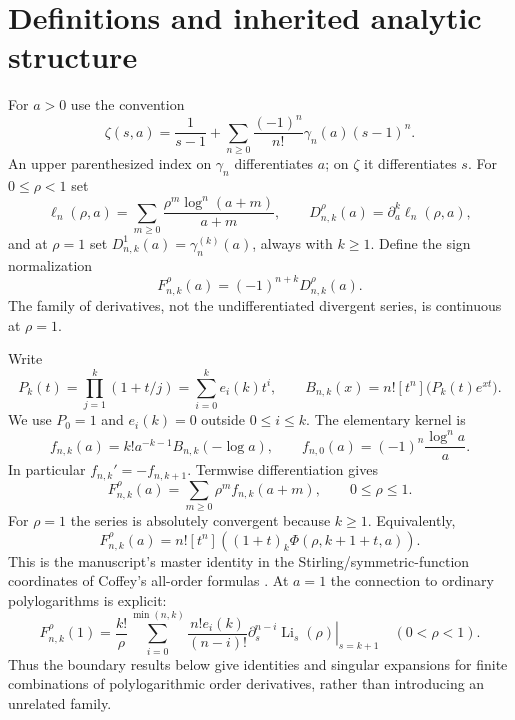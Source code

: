 \documentclass[11pt,letterpaper]{article}
\numberwithin{equation}{section}
\theoremstyle{definition}\newtheorem{definition}[theorem]{Definition}
\theoremstyle{remark}\newtheorem{remark}[theorem]{Remark}
\DeclareMathOperator{\Li}{Li}
\newcommand{\F}[3]{F_{#1,#2}^{#3}}
\newcommand{\coef}[2]{[#1^{#2}]}
\begin{document}
\section{Definitions and inherited analytic structure}\label{sec:structure}
For $a>0$ use the convention
\begin{equation}\label{eq:laurent}
 \zeta(s,a)=\frac1{s-1}+\sum_{n\ge0}\frac{(-1)^n}{n!}\gamma_n(a)(s-1)^n.
\end{equation}
An upper parenthesized index on $\gamma_n$ differentiates $a$; on $\zeta$ it differentiates $s$. For $0\le\rho<1$ set
\[
 \ell_n(\rho,a)=\sum_{m\ge0}\frac{\rho^m\log^n(a+m)}{a+m},
 \qquad
 D_{n,k}^{\rho}(a)=\partial_a^k\ell_n(\rho,a),
\]
and at $\rho=1$ set $D_{n,k}^{1}(a)=\gamma_n^{(k)}(a)$, always with $k\ge1$. Define the sign normalization
\begin{equation}\label{eq:F}
 \F nk\rho(a)=(-1)^{n+k}D_{n,k}^{\rho}(a).
\end{equation}
The family of derivatives, not the undifferentiated divergent series, is continuous at $\rho=1$.

Write
\begin{equation}\label{eq:Pk}
 P_k(t)=\prod_{j=1}^k(1+t/j)=\sum_{i=0}^k e_i(k)t^i,
 \qquad
 B_{n,k}(x)=n!\coef tn\bigl(P_k(t)e^{xt}\bigr).
\end{equation}
We use $P_0=1$ and $e_i(k)=0$ outside $0\le i\le k$. The elementary kernel is
\begin{equation}\label{eq:f}
 f_{n,k}(a)=k!a^{-k-1}B_{n,k}(-\log a),
 \qquad
 f_{n,0}(a)=(-1)^n\frac{\log^n a}{a}.
\end{equation}
In particular $f_{n,k}'=-f_{n,k+1}$. Termwise differentiation gives
\begin{equation}\label{eq:spectral}
 \F nk\rho(a)=\sum_{m\ge0}\rho^m f_{n,k}(a+m),
 \qquad 0\le\rho\le1.
\end{equation}
For $\rho=1$ the series is absolutely convergent because $k\ge1$. Equivalently,
\begin{equation}\label{eq:master}
 \F nk\rho(a)=n!\coef tn\left((1+t)_k\Phi(\rho,k+1+t,a)\right).
\end{equation}
This is the manuscript's master identity in the Stirling/symmetric-function coordinates of Coffey's all-order formulas \cite{coffey,repo}. At $a=1$ the connection to ordinary polylogarithms is explicit:
\begin{equation}\label{eq:polylog}
 \F nk\rho(1)=\frac{k!}{\rho}
 \sum_{i=0}^{\min(n,k)}\frac{n!e_i(k)}{(n-i)!}
 \left.\partial_s^{n-i}\Li_s(\rho)\right|_{s=k+1}
 \quad(0<\rho<1).
\end{equation}
Thus the boundary results below give identities and singular expansions for finite combinations of polylogarithmic order derivatives, rather than introducing an unrelated family.
\end{document}
